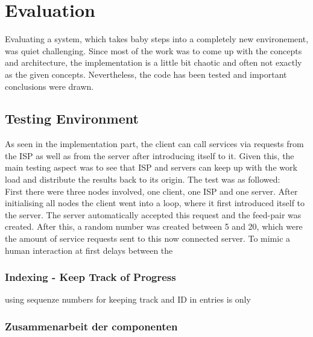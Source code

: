 \chapter{Evaluation}
Evaluating a system, which takes baby steps into a completely new environement, was quiet challenging. Since most of the work was to come up with the concepts and architecture, the implementation is a little bit chaotic and often not exactly as the given concepts. Nevertheless, the code has been tested and important conclusions were drawn.
\section{Testing Environment}
As seen in the implementation part, the client can call services via requests from the ISP as well as from the server after introducing itself to it. Given this, the main testing aspect was to see that ISP and servers can keep up with the work load and distribute the results back to its origin. The test was as followed:\\
First there were three nodes involved, one client, one ISP and one server. After initialising all nodes the client went into a loop, where it first introduced itself to the server. The server automatically accepted this request and the feed-pair was created. After this, a random number was created between 5 and 20, which were the amount of service requests sent to this now connected server. To mimic a human interaction at first delays between the 

\subsection{Indexing - Keep Track of Progress}
using sequenze numbers for keeping track and ID in entries is only 

\subsection{Zusammenarbeit der componenten}